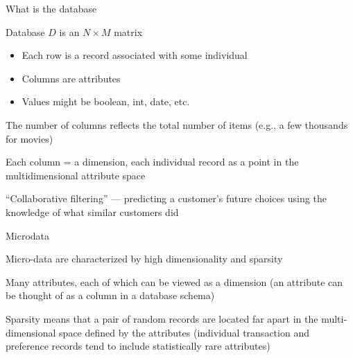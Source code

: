 \documentclass[12pt,aspectratio=169,handout]{beamer}
\begin{document}
\begin{frame}{What is the database}


Database $D$ is an $N \times M$ matrix

\begin{itemize}
\item Each row is a record associated with some individual
\item Columns are attributes
\item Values might be boolean, int, date, etc.
\end{itemize}

The number of columns reflects the total number of items (e.g., a few thousands for movies)

Each column = a dimension, each individual record as a point in the multidimensional attribute space

``Collaborative filtering'' --- predicting a customer’s future choices using the knowledge of what similar customers did




\end{frame}


\begin{frame}{Microdata}


Micro-data are characterized by high dimensionality and sparsity

Many attributes, each of which can be viewed as a dimension (an attribute can be thought of as a column in a database schema)

Sparsity means that a pair of random records are located far apart in the multi-dimensional space defined by the attributes (individual transaction and preference records tend to include statistically rare attributes)



\end{frame}
\end{document}
